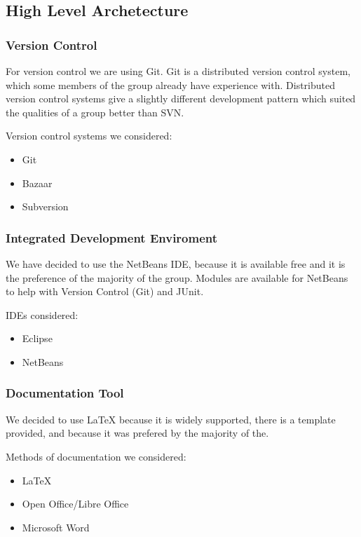 \documentclass{article}
\begin{document}
\subsection{High Level Archetecture}

\subsubsection{Version Control}
For version control we are using Git. Git is a distributed version control
system, which some members of the group already have experience with.
Distributed version control systems give a slightly different development
pattern which suited the qualities of a group better than SVN.

Version control systems we considered:
\begin{itemize}
	\item{Git}
	\item{Bazaar}
	\item{Subversion}
\end{itemize}

\subsubsection{Integrated Development Enviroment}
We have decided to use the NetBeans IDE, because it is available free
and it is the preference of the majority of the group. Modules are
available for NetBeans to help with Version Control (Git) and JUnit.

IDEs considered:
\begin{itemize}
	\item{Eclipse}
	\item{NetBeans}
\end{itemize}

\subsubsection{Documentation Tool}
We decided to use \LaTeX{} because it is widely supported, there is a
template provided, and because it was prefered by the majority of the.

Methods of documentation we considered:
\begin{itemize}
	\item{\LaTeX{}}
	\item{Open Office/Libre Office}
	\item{Microsoft Word}
\end{itemize}
\end{document}
